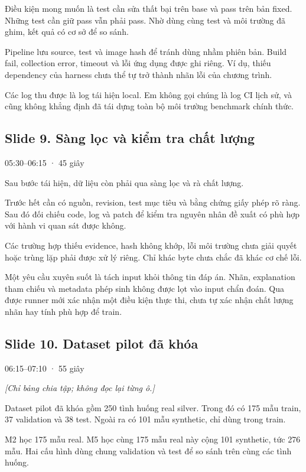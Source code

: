 \documentclass[12pt,a4paper]{article}
\begin{document}
Điều kiện mong muốn là test cần sửa thất bại trên base và pass trên bản fixed. Những test cần giữ pass vẫn phải pass. Nhờ dùng cùng test và môi trường đã ghim, kết quả có cơ sở để so sánh.

Pipeline lưu source, test và image hash để tránh dùng nhầm phiên bản. Build fail, collection error, timeout và lỗi ứng dụng được ghi riêng. Ví dụ, thiếu dependency của harness chưa thể tự trở thành nhãn lỗi của chương trình.

Các log thu được là log tái hiện local. Em không gọi chúng là log CI lịch sử, và cũng không khẳng định đã tái dựng toàn bộ môi trường benchmark chính thức.

\clearpage
\subsection*{Slide 9. Sàng lọc và kiểm tra chất lượng}
{\small\color{gray}05:30–06:15 · 45 giây}\par
Sau bước tái hiện, dữ liệu còn phải qua sàng lọc và rà chất lượng.

Trước hết cần có nguồn, revision, test mục tiêu và bằng chứng giấy phép rõ ràng. Sau đó đối chiếu code, log và patch để kiểm tra nguyên nhân đề xuất có phù hợp với hành vi quan sát được không.

Các trường hợp thiếu evidence, hash không khớp, lỗi môi trường chưa giải quyết hoặc trùng lặp phải được xử lý riêng. Chỉ khác byte chưa chắc đã khác cơ chế lỗi.

Một yêu cầu xuyên suốt là tách input khỏi thông tin đáp án. Nhãn, explanation tham chiếu và metadata phép sinh không được lọt vào input chẩn đoán. Qua được runner mới xác nhận một điều kiện thực thi, chưa tự xác nhận chất lượng nhãn hay tính phù hợp để train.

\subsection*{Slide 10. Dataset pilot đã khóa}
{\small\color{gray}06:15–07:10 · 55 giây}\par
{\itshape\color{gray}[Chỉ bảng chia tập; không đọc lại từng ô.]}\par
Dataset pilot đã khóa gồm 250 tình huống real silver. Trong đó có 175 mẫu train, 37 validation và 38 test. Ngoài ra có 101 mẫu synthetic, chỉ dùng trong train.

M2 học 175 mẫu real. M5 học cùng 175 mẫu real này cộng 101 synthetic, tức 276 mẫu. Hai cấu hình dùng chung validation và test để so sánh trên cùng các tình huống.
\end{document}
